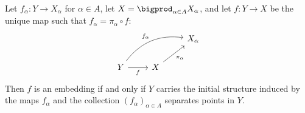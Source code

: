 \documentclass[article, a4paper, 11pt, oneside]{memoir}
\numberwithin{equation}{chapter}
\begin{document}
\begin{proposition}
    Let $f_\alpha \colon Y \to X_\alpha$ for $\alpha \in A$, let $X = \bigprod_{\alpha \in A} X_\alpha$, and let $f \colon Y \to X$ be the unique map such that $f_\alpha = \pi_\alpha \circ f$:
    \begin{equation*}
        \begin{tikzcd}
            && X_\alpha \\
            Y
                \ar[r, "f", swap]
                \ar[rru, "f_\alpha", bend left]
            & X
                \ar[ru, "\pi_\alpha", swap]
        \end{tikzcd}
    \end{equation*}
    Then $f$ is an embedding if and only if $Y$ carries the initial structure induced by the maps $f_\alpha$ and the collection $(f_\alpha)_{\alpha \in A}$ separates points in $Y$.
\end{proposition}
\end{document}
